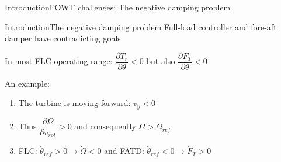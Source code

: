 \begin{frame}{Introduction}{FOWT challenges: The negative damping problem}
\end{frame}


\begin{frame}{Introduction}{The negative damping problem}
	Full-load controller and fore-aft damper have contradicting goals
	
	\smallskip
	In most FLC operating range: $ \dfrac{\partial T_r}{\partial \theta} < 0 $ but also $ \dfrac{\partial F_T}{\partial \theta} < 0 $ 
	
	\smallskip
	An example:
	\begin{enumerate}
		\item The turbine is moving forward: $ v_y < 0 $
		\item Thus $ \dfrac{\partial \Omega}{\partial v_{rot}} > 0 $ and consequently $ \Omega > \Omega_{ref} $
		\item FLC: $ \dot \theta_{ref} > 0 \rightarrow \dot \Omega < 0 $ and FATD: $ \dot \theta_{ref} < 0 \rightarrow \dot F_T > 0 $
	\end{enumerate}
	
\end{frame}



%



